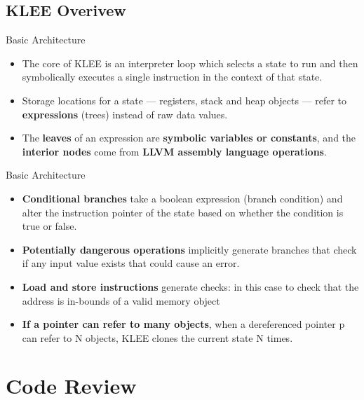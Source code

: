 \documentclass[9pt,aspectratio=43,mathserif,table]{beamer}
\begin{document}
\subsection{KLEE Overivew}
\begin{frame}{Basic Architecture}
	\begin{itemize}
		\item <0-> The core of KLEE is an interpreter loop which selects a state to run and then symbolically executes a
		      single instruction in the context of that state.
		\item <0-> Storage locations for a state — registers, stack and heap objects — refer to \textbf{expressions} (trees) instead of raw data values.
		\item <0-> The \textbf{leaves} of an expression are \textbf{symbolic variables or constants}, and
		      the \textbf{interior nodes} come from \textbf{LLVM assembly language operations}.
	\end{itemize}
\end{frame}

\begin{frame}{Basic Architecture}
	\begin{itemize}
		\item <0-> \textbf{Conditional branches} take a boolean expression
		      (branch condition) and alter the instruction pointer of
		      the state based on whether the condition is true or false.
		\item <0-> \textbf{Potentially dangerous operations} implicitly generate
		      branches that check if any input value exists that could
		      cause an error.
		\item <0-> \textbf{Load and store instructions} generate checks: in this case to check that the
		      address is in-bounds of a valid memory object
		\item <0-> \textbf{If a pointer can refer to many objects}, when a dereferenced pointer p
		      can refer to N objects, KLEE clones the current state N times.
	\end{itemize}
\end{frame}



\section{Code Review}
\end{document}
